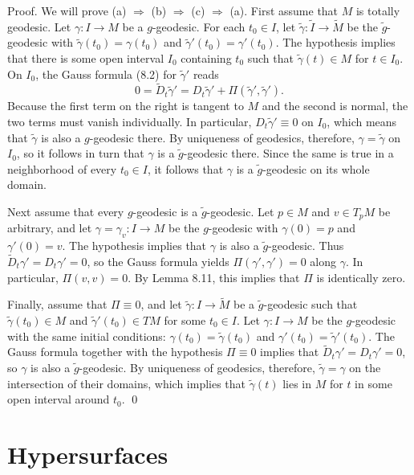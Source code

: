 Proof. We will prove (a) $\Rightarrow$ (b) $\Rightarrow$ (c) $\Rightarrow$ (a). First assume that $M$ is totally geodesic. Let $\gamma: I \to M$ be a $g$-geodesic. For each $t_0 \in I$, let $\tilde{\gamma}: \tilde{I} \to \tilde{M}$ be the $\tilde{g}$-geodesic with $\tilde{\gamma}(t_0) = \gamma(t_0)$ and $\tilde{\gamma}'(t_0) = \gamma'(t_0)$. The hypothesis implies that there is some open interval $I_0$ containing $t_0$ such that $\tilde{\gamma}(t) \in M$ for $t \in I_0$. On $I_0$, the Gauss formula (8.2) for $\tilde{\gamma}'$ reads
\[
0 = \tilde{D}_t \tilde{\gamma}' = D_t \tilde{\gamma}' + \Pi(\tilde{\gamma}', \tilde{\gamma}').
\]
Because the first term on the right is tangent to $M$ and the second is normal, the two terms must vanish individually. In particular, $D_t \tilde{\gamma}' \equiv 0$ on $I_0$, which means that $\tilde{\gamma}$ is also a $g$-geodesic there. By uniqueness of geodesics, therefore, $\gamma = \tilde{\gamma}$ on $I_0$, so it follows in turn that $\gamma$ is a $\tilde{g}$-geodesic there. Since the same is true in a neighborhood of every $t_0 \in I$, it follows that $\gamma$ is a $\tilde{g}$-geodesic on its whole domain.

Next assume that every $g$-geodesic is a $\tilde{g}$-geodesic. Let $p \in M$ and $v \in T_p M$ be arbitrary, and let $\gamma = \gamma_v: I \to M$ be the $g$-geodesic with $\gamma(0) = p$ and $\gamma'(0) = v$. The hypothesis implies that $\gamma$ is also a $\tilde{g}$-geodesic. Thus $\tilde{D}_t \gamma' = D_t \gamma' = 0$, so the Gauss formula yields $\Pi(\gamma', \gamma') = 0$ along $\gamma$. In particular, $\Pi(v, v) = 0$. By Lemma 8.11, this implies that $\Pi$ is identically zero.

Finally, assume that $\Pi \equiv 0$, and let $\tilde{\gamma}: I \to \tilde{M}$ be a $\tilde{g}$-geodesic such that $\tilde{\gamma}(t_0) \in M$ and $\tilde{\gamma}'(t_0) \in TM$ for some $t_0 \in I$. Let $\gamma: I \to M$ be the $g$-geodesic with the same initial conditions: $\gamma(t_0) = \tilde{\gamma}(t_0)$ and $\gamma'(t_0) = \tilde{\gamma}'(t_0)$. The Gauss formula together with the hypothesis $\Pi \equiv 0$ implies that $\tilde{D}_t \gamma' = D_t \gamma' = 0$, so $\gamma$ is also a $\tilde{g}$-geodesic. By uniqueness of geodesics, therefore, $\tilde{\gamma} = \gamma$ on the intersection of their domains, which implies that $\tilde{\gamma}(t)$ lies in $M$ for $t$ in some open interval around $t_0$. \qed

\section{Hypersurfaces}

